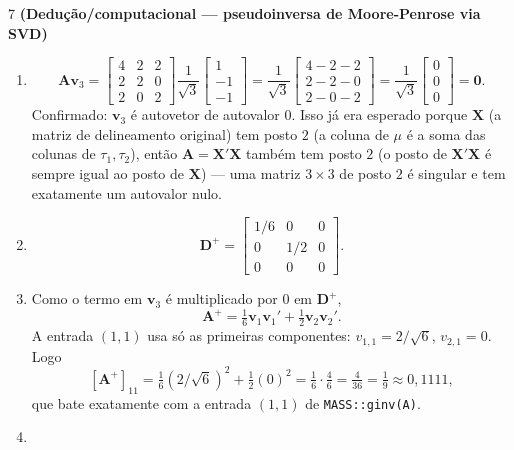 \documentclass[11pt]{article}
\begin{document}
\begin{questao}{7} \textbf{(Dedução/computacional --- pseudoinversa de Moore-Penrose via SVD)}
\end{questao}
\begin{solucao}
\begin{enumerate}[label=(\alph*)]
  \item
  $$
  \mathbf{A}\mathbf{v}_3 = \begin{bmatrix}4&2&2\\2&2&0\\2&0&2\end{bmatrix}
  \frac{1}{\sqrt3}\begin{bmatrix}1\\-1\\-1\end{bmatrix} =
  \frac{1}{\sqrt3}\begin{bmatrix}4-2-2\\2-2-0\\2-0-2\end{bmatrix} =
  \frac{1}{\sqrt3}\begin{bmatrix}0\\0\\0\end{bmatrix} = \mathbf{0}.
  $$
  Confirmado: $\mathbf{v}_3$ é autovetor de autovalor $0$. Isso já era esperado porque
  $\mathbf{X}$ (a matriz de delineamento original) tem posto $2$ (a coluna de $\mu$ é a soma das
  colunas de $\tau_1,\tau_2$), então $\mathbf{A}=\mathbf{X}'\mathbf{X}$ também tem posto $2$ (o
  posto de $\mathbf{X}'\mathbf{X}$ é sempre igual ao posto de $\mathbf{X}$) --- uma matriz
  $3\times3$ de posto $2$ é singular e tem exatamente um autovalor nulo.
  \item
  $$
  \mathbf{D}^+ = \begin{bmatrix} 1/6 & 0 & 0 \\ 0 & 1/2 & 0 \\ 0 & 0 & 0 \end{bmatrix}.
  $$
  \item Como o termo em $\mathbf{v}_3$ é multiplicado por $0$ em $\mathbf{D}^+$,
  $$
  \mathbf{A}^+ = \tfrac16 \mathbf{v}_1\mathbf{v}_1' + \tfrac12 \mathbf{v}_2\mathbf{v}_2'.
  $$
  A entrada $(1,1)$ usa só as primeiras componentes: $v_{1,1} = 2/\sqrt6$, $v_{2,1}=0$. Logo
  $$
  [\mathbf{A}^+]_{11} = \tfrac16 (2/\sqrt6)^2 + \tfrac12 (0)^2 = \tfrac16 \cdot \tfrac46 =
  \tfrac{4}{36} = \tfrac19 \approx 0{,}1111,
  $$
  que bate exatamente com a entrada $(1,1)$ de \texttt{MASS::ginv(A)}.
  \item

\end{enumerate}
\end{solucao}
\end{document}
